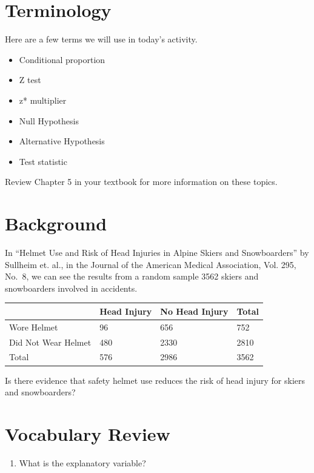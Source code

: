 \documentclass[
]{report}
\providecommand{\tightlist}{%
  \setlength{\itemsep}{0pt}\setlength{\parskip}{0pt}}
\begin{document}
\hypertarget{terminology-1}{%
\section{Terminology}\label{terminology-1}}

Here are a few terms we will use in today's activity.

\begin{itemize}
\item
  Conditional proportion
\item
  Z test
\item
  z* multiplier
\item
  Null Hypothesis
\item
  Alternative Hypothesis
\item
  Test statistic
\end{itemize}

Review Chapter 5 in your textbook for more information on these topics.

\hypertarget{background}{%
\section{Background}\label{background}}

In ``Helmet Use and Risk of Head Injuries in Alpine Skiers and Snowboarders'' by Sullheim et. al., in the Journal of the American Medical Association, Vol. 295, No.~8, we can see the results from a random sample 3562 skiers and snowboarders involved in accidents.

\begin{longtable}[]{@{}llll@{}}
\toprule
& Head Injury & No Head Injury & Total\tabularnewline
\midrule
\endhead
Wore Helmet & 96 & 656 & 752\tabularnewline
Did Not Wear Helmet & 480 & 2330 & 2810\tabularnewline
Total & 576 & 2986 & 3562\tabularnewline
\bottomrule
\end{longtable}

Is there evidence that safety helmet use reduces the risk of head injury for skiers and snowboarders?

\hypertarget{vocabulary-review-3}{%
\section{Vocabulary Review}\label{vocabulary-review-3}}

\begin{enumerate}
\def\labelenumi{\arabic{enumi}.}
\tightlist
\item
  What is the explanatory variable?
\end{enumerate}
\end{document}

